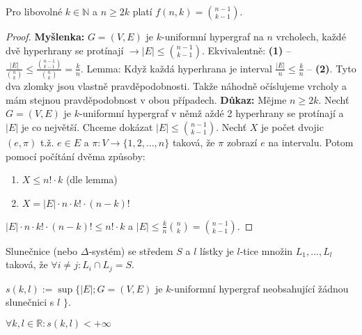 \begin{veta}
	Pro libovolné $k \in \mathbb{N}$ a $n \geq 2k$ platí $f(n,k) = \binom{n-1}{k-1}$.
\end{veta}

\begin{proof}
	\textbf{Myšlenka:} $G = (V,E)$ je $k$-uniformní hypergraf na $n$ vrcholech, každé dvě hyperhrany se protínají $\to |E| \leq \binom{n-1}{k-1}$. Ekvivalentně: \textbf{(1)} -- $\frac{|E|}{\binom{n}{k}} \leq \frac{\binom{n-1}{k-1}}{\binom{n}{k}} = \frac{k}{n}$. Lemma: Když každá hyperhrana je interval $\frac{|E|}{n} \leq \frac{k}{n}$ -- \textbf{(2)}. Tyto dva zlomky jsou vlastně pravděpodobnosti. Takže náhodně očíslujeme vrcholy a mám stejnou pravděpodobnost v obou případech. \textbf{Důkaz:} Mějme $n \geq 2k$. Nechť $G= (V,E)$ je $k$-uniformní hypergraf v němž aždé 2 hyperhrany se protínají a $|E|$ je co největší. Chceme dokázat $|E| \leq \binom{n-1}{k-1}$. Nechť $X$ je počet dvojic $(e,\pi)$ t.ž. $e \in E$ a $\pi: V \to \{1,2,\dots,n\}$ taková, že $\pi$ zobrazí $e$ na intervalu. Potom pomocí počítání dvěma způsoby:
	
	\begin{enumerate}
		\item $X \leq n! \cdot k$ (dle lemma)
		\item $X = |E| \cdot n \cdot k! \cdot (n-k)!$
	\end{enumerate}
	
	$|E| \cdot n \cdot k! \cdot (n-k)! \leq n! \cdot k$ a $|E| \leq \frac{k}{n} \binom{n}{k} = \binom{n-1}{k-1}$.
\end{proof}

\begin{definice}
	Slunečnice (nebo $\Delta$-systém) se středem $S$ a $l$ lístky je $l$-tice množin $L_{1},\dots,L_{l}$ taková, že $\forall i \neq j: L_{i} \cap L_{j} = S$.
\end{definice}

\begin{definice}
	$s(k,l) := \sup \{|E|; G = (V,E)$ je $k$-uniformní hypergraf neobsahující žádnou slunečnici s  $l$ $\}$.
\end{definice}

\begin{veta}
	$\forall k,l \in \mathbb{R}: s(k,l) < + \infty$
\end{veta}

